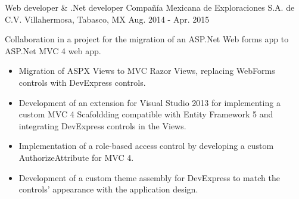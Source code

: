 \begin{cventries}

\cventry
{Web developer \& .Net developer} %
{Compañía Mexicana de Exploraciones S.A. de C.V.} %
{Villahermosa, Tabasco, MX} %
{Aug. 2014 - Apr. 2015} %
{ %
	\begin{cvitems}
		\item {Collaboration in a project for the migration of an ASP.Net Web forms app to ASP.Net MVC 4 web app.}
		\begin{itemize}
			\item {Migration of ASPX Views to MVC Razor Views, replacing WebForms controls with DevExpress controls.}
			\item {Development of an extension for Visual Studio 2013 for implementing a custom MVC 4 Scafoldding compatible with Entity Framework 5 and integrating DevExpress controls in the Views.}
			\item {Implementation of a role-based access control by developing a custom AuthorizeAttribute for MVC 4. }
			\item {Development of a custom theme assembly for DevExpress to match the controls' appearance with the application design.}
		\end{itemize}
	\end{cvitems}
}



\end{cventries}
